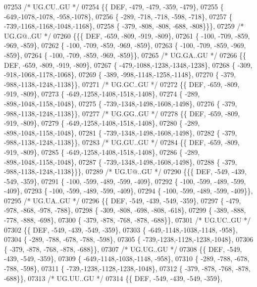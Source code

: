 \begin{DoxyCode}
07253 \textcolor{comment}{/* UG.CU..GU */}
07254 \{\{  DEF, -479, -479, -359, -479\},
07255 \{ -649,-1078,-1078, -958,-1078\},
07256 \{ -289, -718, -718, -598, -718\},
07257 \{ -739,-1168,-1168,-1048,-1168\},
07258 \{ -379, -808, -808, -688, -808\}\}\},
07259 \textcolor{comment}{/* UG.G@..GU */}
07260 \{\{\{  DEF, -659, -809, -919, -809\},
07261 \{ -100, -709, -859, -969, -859\},
07262 \{ -100, -709, -859, -969, -859\},
07263 \{ -100, -709, -859, -969, -859\},
07264 \{ -100, -709, -859, -969, -859\}\},
07265 \textcolor{comment}{/* UG.GA..GU */}
07266 \{\{  DEF, -659, -809, -919, -809\},
07267 \{ -479,-1088,-1238,-1348,-1238\},
07268 \{ -309, -918,-1068,-1178,-1068\},
07269 \{ -389, -998,-1148,-1258,-1148\},
07270 \{ -379, -988,-1138,-1248,-1138\}\},
07271 \textcolor{comment}{/* UG.GC..GU */}
07272 \{\{  DEF, -659, -809, -919, -809\},
07273 \{ -649,-1258,-1408,-1518,-1408\},
07274 \{ -289, -898,-1048,-1158,-1048\},
07275 \{ -739,-1348,-1498,-1608,-1498\},
07276 \{ -379, -988,-1138,-1248,-1138\}\},
07277 \textcolor{comment}{/* UG.GG..GU */}
07278 \{\{  DEF, -659, -809, -919, -809\},
07279 \{ -649,-1258,-1408,-1518,-1408\},
07280 \{ -289, -898,-1048,-1158,-1048\},
07281 \{ -739,-1348,-1498,-1608,-1498\},
07282 \{ -379, -988,-1138,-1248,-1138\}\},
07283 \textcolor{comment}{/* UG.GU..GU */}
07284 \{\{  DEF, -659, -809, -919, -809\},
07285 \{ -649,-1258,-1408,-1518,-1408\},
07286 \{ -289, -898,-1048,-1158,-1048\},
07287 \{ -739,-1348,-1498,-1608,-1498\},
07288 \{ -379, -988,-1138,-1248,-1138\}\}\},
07289 \textcolor{comment}{/* UG.U@..GU */}
07290 \{\{\{  DEF, -549, -439, -549, -359\},
07291 \{ -100, -599, -489, -599, -409\},
07292 \{ -100, -599, -489, -599, -409\},
07293 \{ -100, -599, -489, -599, -409\},
07294 \{ -100, -599, -489, -599, -409\}\},
07295 \textcolor{comment}{/* UG.UA..GU */}
07296 \{\{  DEF, -549, -439, -549, -359\},
07297 \{ -479, -978, -868, -978, -788\},
07298 \{ -309, -808, -698, -808, -618\},
07299 \{ -389, -888, -778, -888, -698\},
07300 \{ -379, -878, -768, -878, -688\}\},
07301 \textcolor{comment}{/* UG.UC..GU */}
07302 \{\{  DEF, -549, -439, -549, -359\},
07303 \{ -649,-1148,-1038,-1148, -958\},
07304 \{ -289, -788, -678, -788, -598\},
07305 \{ -739,-1238,-1128,-1238,-1048\},
07306 \{ -379, -878, -768, -878, -688\}\},
07307 \textcolor{comment}{/* UG.UG..GU */}
07308 \{\{  DEF, -549, -439, -549, -359\},
07309 \{ -649,-1148,-1038,-1148, -958\},
07310 \{ -289, -788, -678, -788, -598\},
07311 \{ -739,-1238,-1128,-1238,-1048\},
07312 \{ -379, -878, -768, -878, -688\}\},
07313 \textcolor{comment}{/* UG.UU..GU */}
07314 \{\{  DEF, -549, -439, -549, -359\},

\end{DoxyCode}
